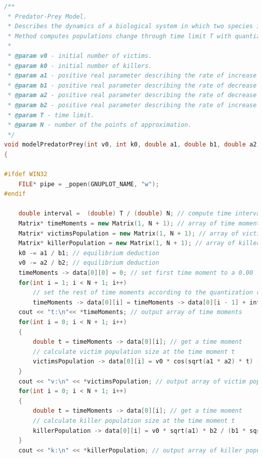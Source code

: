 \documentclass[11pt]{article}
\begin{document}
\begin{lstlisting}[language=C++, caption=Implementation of Predator-prey model]
/**
 * Predator-Prey Model.
 * Describes the dynamics of a biological system in which two species interact, one as a predator and the other as prey.
 * Method computes populations change through time limit T with quantization resolution N.
 *
 * @param v0 - initial number of victims.
 * @param k0 - initial number of killers.
 * @param a1 - positive real parameter describing the rate of increase in the prey population (reproduction coefficient).
 * @param b1 - positive real parameter describing the rate of decrease in the prey population (hunting coefficient).
 * @param a2 - positive real parameter describing the rate of decrease in the predator population (natural selection coefficient).
 * @param b2 - positive real parameter describing the rate of increase in the predator population (reproduction coefficient).
 * @param T - time limit.
 * @param N - number of the points of approximation.
 */
void modelPredatorPrey(int v0, int k0, double a1, double b1, double a2, double b2, int T, int N)
{

#ifdef WIN32
    FILE* pipe = _popen(GNUPLOT_NAME, "w");
#endif

    double interval =  (double) T / (double) N; // compute time interval of quantization
    Matrix* timeMoments = new Matrix(1, N + 1); // array of time moments
    Matrix* victimsPopulation = new Matrix(1, N + 1); // array of victim population size
    Matrix* killerPopulation = new Matrix(1, N + 1); // array of killer population size
    k0 -= a1 / b1; // equilibrium deduction
    v0 -= a2 / b2; // equilibrium deduction
    timeMoments -> data[0][0] = 0; // set first time moment to a 0.00
    for(int i = 1; i < N + 1; i++)
        // set the rest of time moments according to the quantization resolution
        timeMoments -> data[0][i] = timeMoments -> data[0][i - 1] + interval;
    cout << "t:\n"<< *timeMoments; // output array of time moments
    for(int i = 0; i < N + 1; i++)
    {
        double t = timeMoments -> data[0][i]; // get a time moment
        // calculate victim population size at the time moment t
        victimsPopulation -> data[0][i] = v0 * cos(sqrt(a1 * a2) * t) - k0 * sqrt(a2) * b1 / (b2 * sqrt(a1)) * sin(sqrt(a1 * a2) * t) + a2 / b2;
    }
    cout << "v:\n" << *victimsPopulation; // output array of victim population size
    for(int i = 0; i < N + 1; i++)
    {
        double t = timeMoments -> data[0][i]; // get a time moment
        // calculate killer population size at the time moment t
        killerPopulation -> data[0][i] = v0 * sqrt(a1) * b2 / (b1 * sqrt(a2)) * sin(sqrt(a1 * a2) * t) + k0 * cos(sqrt(a1 * a2) * t) + a1 / b1;
    }
    cout << "k:\n" << *killerPopulation; // output array of killer population size


\end{lstlisting}
\end{document}
